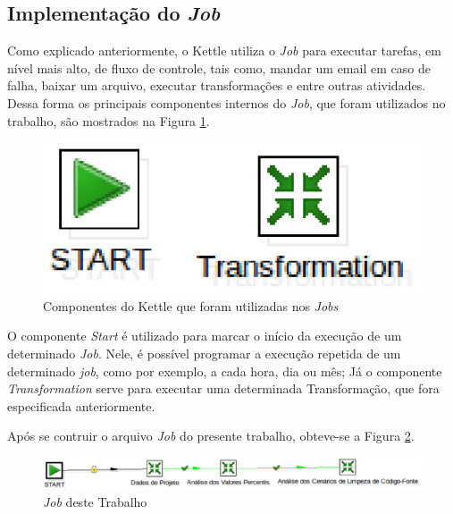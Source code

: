 \begin{apendicesenv}



\section{Implementação do \textit{Job}}

Como explicado anteriormente, o Kettle utiliza o  \textit{Job} para executar tarefas, em nível mais alto, de fluxo de controle, tais como, mandar um email em caso de falha, baixar um arquivo, executar transformações  e entre outras atividades. Dessa forma os principais componentes internos do \textit{Job}, que foram utilizados no trabalho, são mostrados na Figura \ref{fig:components-job}. 

\begin{figure}[H]
\centering
\includegraphics[keepaspectratio=false,scale=0.60]{figuras/componentes-job.eps}
\caption{Componentes do Kettle que foram utilizadas nos \textit{Jobs}}
\label{fig:components-job}
\end{figure}
\FloatBarrier

O componente \textit{Start} é utilizado para marcar o início da execução de um determinado \textit{Job}. Nele, é possível programar a execução repetida de um determinado \textit{job}, como por exemplo, a cada hora, dia ou mês; Já o componente \textit{Transformation} serve para executar uma determinada Transformação, que fora especificada anteriormente.

Após se contruir o arquivo \textit{Job} do presente trabalho, obteve-se a Figura \ref{fig:job}. 

\begin{figure}[H]
\centering
\includegraphics[keepaspectratio=false,scale=0.60]{figuras/job.eps}
\caption{\textit{Job} deste Trabalho}
\label{fig:job}
\end{figure}
\FloatBarrier


\end{apendicesenv}
